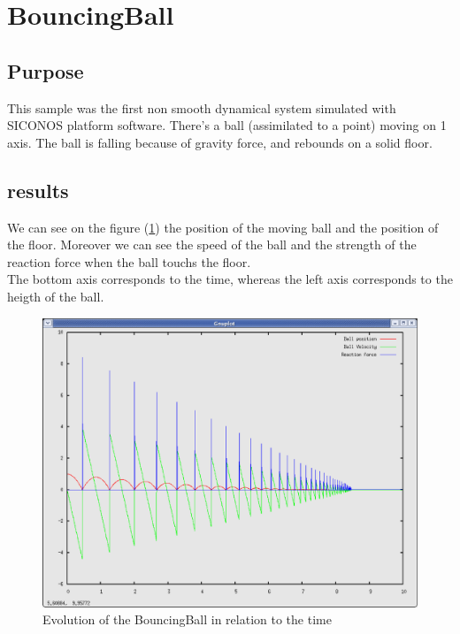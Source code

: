 \section{BouncingBall}
\subsection{Purpose}
This sample was the first non smooth dynamical system simulated with SICONOS platform software.
There's a ball (assimilated to a point) moving on 1 axis.
The ball is falling because of gravity force, and rebounds on a solid floor.

\subsection{results}
We can see on the figure (\ref{fig: BouncingBall}) the position of the moving ball and the position of the floor. Moreover we can see the speed of the ball and the strength of the reaction force when the ball touchs the floor.\\
The bottom axis corresponds to the time, whereas the left axis corresponds to the heigth of the ball.
	\begin{figure}
	\begin{center}
	\includegraphics[scale=0.6, clip]{figure/BouncingBall.eps}
	\caption{Evolution of the BouncingBall in relation to the time}
	\label{fig: BouncingBall}
	\end{center}
	\end{figure}

\pagebreak

